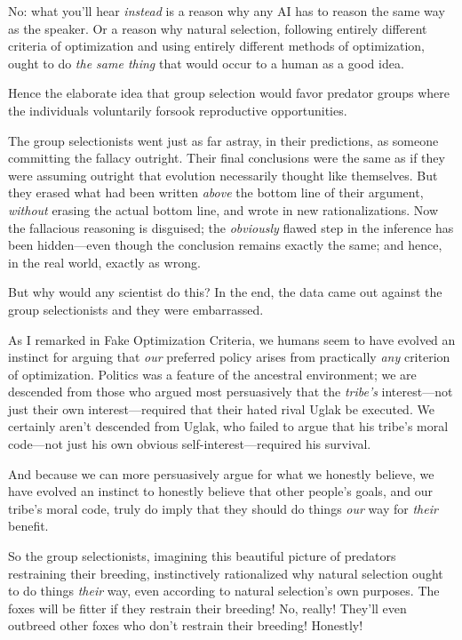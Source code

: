 {{{
 No: what you'll hear \textit{instead} is a reason
why any AI has to reason the same way as the speaker. Or a reason why
natural selection, following entirely different criteria of
optimization and using entirely different methods of optimization,
ought to do \textit{the same thing} that would occur to a human as a
good idea.}

{
 Hence the elaborate idea that group selection would favor predator
groups where the individuals voluntarily forsook reproductive
opportunities.}

{
 The group selectionists went just as far astray, in their
predictions, as someone committing the fallacy outright. Their final
conclusions were the same as if they were assuming outright that
evolution necessarily thought like themselves. But they erased what had
been written \textit{above} the bottom line of their argument,
\textit{without} erasing the actual bottom line, and wrote in new
rationalizations. Now the fallacious reasoning is disguised; the
\textit{obviously} flawed step in the inference has been hidden---even
though the conclusion remains exactly the same; and hence, in the real
world, exactly as wrong.}

{
 But why would any scientist do this? In the end, the data came out
against the group selectionists and they were embarrassed.}

{
 As I remarked in Fake Optimization Criteria, we humans seem to
have evolved an instinct for arguing that \textit{our} preferred policy
arises from practically \textit{any} criterion of optimization.
Politics was a feature of the ancestral environment; we are descended
from those who argued most persuasively that the
\textit{tribe's} interest---not just their own
interest---required that their hated rival Uglak be executed. We
certainly aren't descended from Uglak, who failed to
argue that his tribe's moral code{}---not just his own
obvious self-interest---required his survival.}

{
 And because we can more persuasively argue for what we honestly
believe, we have evolved an instinct to honestly believe that other
people's goals, and our tribe's moral
code, truly do imply that they should do things \textit{our} way for
\textit{their} benefit.}

{
 So the group selectionists, imagining this beautiful picture of
predators restraining their breeding, instinctively rationalized why
natural selection ought to do things \textit{their} way, even according
to natural selection's own purposes. The foxes will be
fitter if they restrain their breeding! No, really!
They'll even outbreed other foxes who
don't restrain their breeding! Honestly!}

}}
